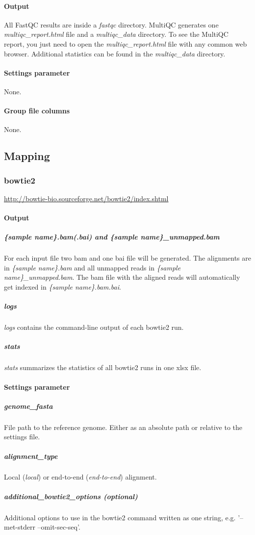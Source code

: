 \documentclass[a4paper]{article}
\begin{document}
\paragraph{Output}
All FastQC results are inside a \emph{fastqc} directory. MultiQC generates one \emph{multiqc\_report.html} file and a \emph{multiqc\_data} directory. To see the MultiQC report, you just need to open the \emph{multiqc\_report.html} file with any common web browser. Additional statistics can be found in the \emph{multiqc\_data} directory.
\paragraph{Settings parameter} None.
\paragraph{Group file columns} None.

\subsection{Mapping}
\subsubsection{bowtie2}
\url{http://bowtie-bio.sourceforge.net/bowtie2/index.shtml}
\paragraph{Output} 
\subparagraph{\{sample name\}.bam(.bai) and \{sample name\}\_unmapped.bam}
For each input file two bam and one bai file will be generated. The alignments are in \emph{\{sample name\}.bam} and all unmapped reads in \emph{\{sample name\}\_unmapped.bam}. The bam file with the aligned reads will automatically get indexed in \emph{\{sample name\}.bam.bai}.
\subparagraph{logs}
\emph{logs} contains the command-line output of each bowtie2 run. 
\subparagraph{stats}
\emph{stats} summarizes the statistics of all bowtie2 runs in one xlsx file.
\paragraph{Settings parameter} 
\subparagraph{genome\_fasta}
File path to the reference genome. Either as an absolute path or relative to the settings file.
\subparagraph{alignment\_type} Local (\emph{local}) or end-to-end (\emph{end-to-end}) alignment.
\subparagraph{additional\_bowtie2\_options (optional)} Additional options to use in the bowtie2 command written as one string, e.g. '--met-stderr --omit-sec-seq'.
\end{document}
